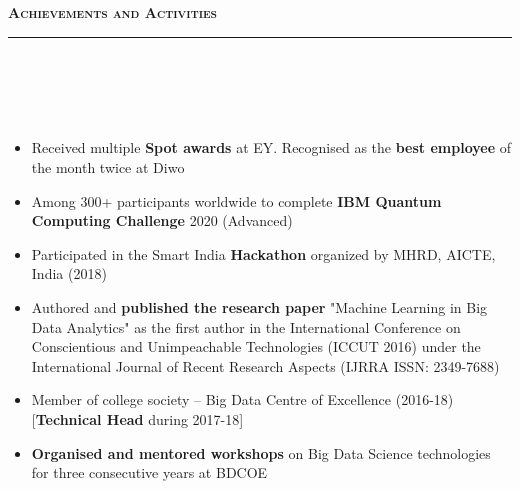 \documentclass[a4paper,10pt]{article}
\newcommand{\lsep}{-0.5cm}
\newcommand{\resheading}[1]{{\small
        {
            \begin{minipage}
                {0.992\textwidth}\textbf{{\textsc{#1 \vphantom{p\^{E}} }}}
                \\[-0.3cm]
                \hrule
            \end{minipage}
            \\[-0.5cm]
        }
 }}
\begin{document}
\vspace{4pt}
\noindent
\resheading{\textbf{\large Achievements and Activities}}\\[\lsep] 
\\[-0.2cm]
\begin{itemize}

\item Received multiple \textbf{Spot awards} at EY. Recognised as the \textbf{best employee} of the month twice at Diwo \\[-0.55cm]

\item Among 300+ participants worldwide to complete \textbf{IBM Quantum Computing Challenge} 2020 (Advanced) \\[-0.55cm]

\item Participated in the Smart India \textbf{Hackathon} organized by MHRD, AICTE, India (2018) \\[-0.55cm]


\item Authored and \textbf{published the research paper} "Machine Learning in Big Data Analytics" as the first author in the International Conference on Conscientious and Unimpeachable Technologies (ICCUT 2016) under the International Journal of Recent Research Aspects (IJRRA ISSN: 2349-7688) \\[-0.55cm]


\item Member of college society -- Big Data Centre of Excellence (2016-18) [\textbf{Technical Head} during  2017-18] \\[-0.55cm]

\item \textbf{Organised and mentored workshops} on Big Data Science technologies for three consecutive years at BDCOE \\[-0.55cm]





\end{itemize}
\end{document}

